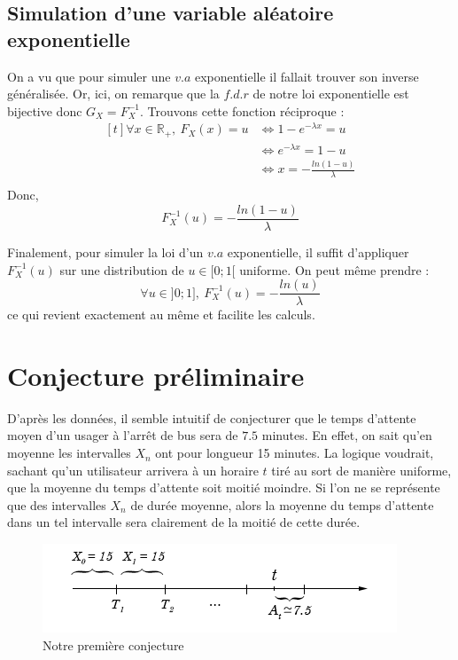 \documentclass[a4paper, titlepage]{livret} %
\begin{document}
			\subsection{Simulation d'une variable aléatoire exponentielle}
				On a vu que pour simuler une $v.a$ exponentielle il fallait trouver son inverse généralisée.
				Or, ici, on remarque que la $f.d.r$ de notre loi exponentielle est bijective donc $G_{X} = F_{X}^{-1}$.
				Trouvons cette fonction réciproque :
				\[\begin{aligned}[t]
					\forall x \in \mathbb{R}_{+}, \ F_{X}(x) = u & \Leftrightarrow 1 - e^{-\lambda x} = u \\
									& \Leftrightarrow e^{-\lambda x} = 1 - u\\
									& \Leftrightarrow x = -\frac{ln(1 - u)}{\lambda} \\
				\end{aligned}\]
				Donc, 
				\[
					F_{X}^{-1}(u) = -\frac{ln(1 - u)}{\lambda}
				\]

				Finalement, pour simuler la loi d'un $v.a$ exponentielle, il suffit d'appliquer $F_{X}^{-1}(u)$ sur une distribution de $u \in [0; 1[$ uniforme.
				On peut même prendre :
				\[\boxed{
					\forall u \in ]0;1], \ F_{X}^{-1}(u) = -\frac{ln(u)}{\lambda}
				}\]
				ce qui revient exactement au même et facilite les calculs.

		\section{Conjecture préliminaire}
			D'après les données, il semble intuitif de conjecturer que le temps d'attente moyen d'un usager à l'arrêt de bus sera de $7.5$ minutes.
			En effet, on sait qu'en moyenne les intervalles $X_{n}$ ont pour longueur 15 minutes.
			La logique voudrait, sachant qu'un utilisateur arrivera à un horaire $t$ tiré au sort de manière uniforme, que la moyenne du temps d'attente soit moitié moindre.
			Si l'on ne se représente que des intervalles $X_{n}$ de durée moyenne, alors la moyenne du temps d'attente dans un tel intervalle sera clairement de la moitié de cette durée.
			\begin{figure}[!ht]
				\centering
  					\includegraphics[scale=0.6]{g4.png}
  					\caption{Notre première conjecture}
			\end{figure}
			\newpage
\end{document}
